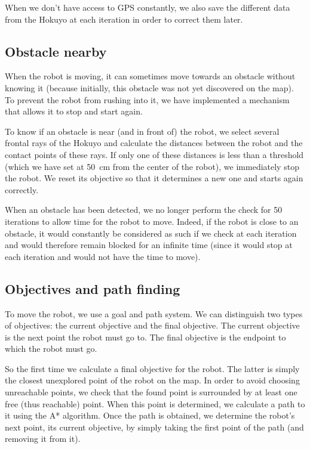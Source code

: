 \documentclass[a4paper, 10pt, conference]{ieeeconf}
\begin{document}
    When we don't have access to GPS constantly, we also save the different data from the Hokuyo at each iteration in order to correct them later.
    
    \subsection{Obstacle nearby}
    
    When the robot is moving, it can sometimes move towards an obstacle without knowing it (because initially, this obstacle was not yet discovered on the map). To prevent the robot from rushing into it, we have implemented a mechanism that allows it to stop and start again.
    
    To know if an obstacle is near (and in front of) the robot, we select several frontal rays of the Hokuyo and calculate the distances between the robot and the contact points of these rays. If only one of these distances is less than a threshold (which we have set at \SI{50}{\centi\meter} from the center of the robot), we immediately stop the robot. We reset its objective so that it determines a new one and starts again correctly.
    
    When an obstacle has been detected, we no longer perform the check for \num{50} iterations to allow time for the robot to move. Indeed, if the robot is close to an obstacle, it would constantly be considered as such if we check at each iteration and would therefore remain blocked for an infinite time (since it would stop at each iteration and would not have the time to move).
    
    \subsection{Objectives and path finding}
    
    To move the robot, we use a goal and path system. We can distinguish two types of objectives: the current objective and the final objective. The current objective is the next point the robot must go to. The final objective is the endpoint to which the robot must go.
    
    So the first time we calculate a final objective for the robot. The latter is simply the closest unexplored point of the robot on the map. In order to avoid choosing unreachable points, we check that the found point is surrounded by at least one free (thus reachable) point. When this point is determined, we calculate a path to it using the A* algorithm. Once the path is obtained, we determine the robot's next point, its current objective, by simply taking the first point of the path (and removing it from it).
    
\end{document}
